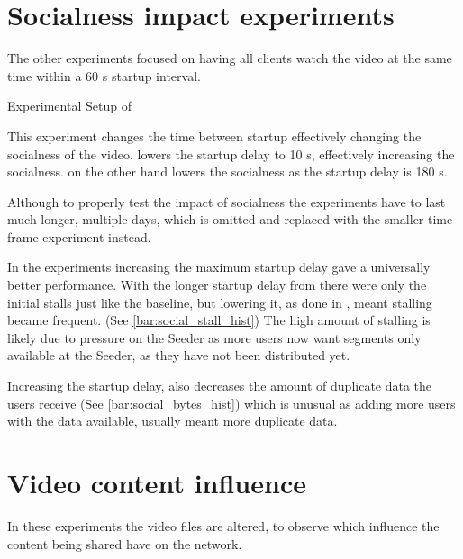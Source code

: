 \if{}

\fi

\FloatBarrier \section{Socialness impact experiments}
\label{sec:eval_socialness}
The other experiments focused on having all clients watch the video at the same time within a 60 \ac{s} startup interval.

\begin{table}[!htbp]
    \myfloatalign
    \caption[Experimental Setup of Socialness]{Experimental Setup of }
    \label{tab:exp_overview_socialness}
    
\end{table}

This experiment changes the time between startup effectively changing the socialness of the video.  lowers the startup delay to 10 \ac{s}, effectively increasing the socialness.  on the other hand lowers the socialness as the startup delay is 180 \ac{s}.

Although to properly test the impact of socialness the experiments have to last much longer, multiple days, which is omitted and replaced with the smaller time frame experiment instead.

In the experiments increasing the maximum startup delay gave a universally better performance. With the longer startup delay from  there were only the initial stalls just like the baseline, but lowering it, as done in , meant stalling became frequent. (See \autoref{bar:social_stall_hist}) The high amount of stalling is likely due to pressure on the Seeder as more users now want segments only available at the Seeder, as they have not been distributed yet.

Increasing the startup delay, also decreases the amount of duplicate data the users receive (See \autoref{bar:social_bytes_hist}) which is unusual as adding more users with the data available, usually meant more duplicate data. %

\if{}


\fi

\FloatBarrier 
\section{Video content influence}
\label{sec:eval_video}
In these experiments the video files are altered, to observe which influence the content being shared have on the network.

